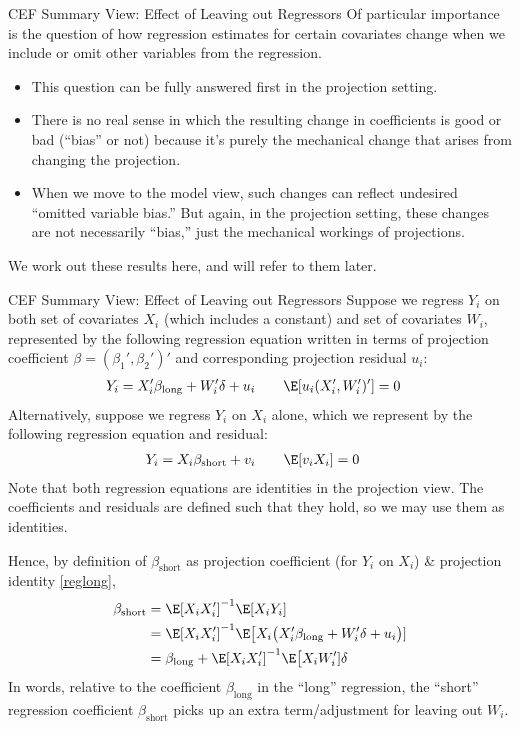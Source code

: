 \documentclass[aspectratio=169, handout]{beamer}
\begin{document}
{\footnotesize
\begin{frame}{CEF Summary View: Effect of Leaving out Regressors}
Of particular importance is the question of how regression estimates for
certain covariates change when we include or omit other variables from
the regression.
\begin{itemize}
  \item This question can be fully answered first in the projection
    setting.

  \item There is no real sense in which the resulting change in
    coefficients is good or bad (``bias'' or not) because it's purely
    the mechanical change that arises from changing the projection.

  \item When we move to the model view, such changes can reflect
    undesired ``omitted variable bias.'' But again, in the projection
    setting, these changes are not necessarily ``bias,'' just the
    mechanical workings of projections.
\end{itemize}
We work out these results here, and will refer to them later.
\end{frame}
}

{\scriptsize
\begin{frame}{CEF Summary View: Effect of Leaving out Regressors}
Suppose we regress $Y_i$ on both set of covariates $X_i$ (which includes
a constant) and set of covariates $W_i$, represented by the
following regression equation written in terms of projection coefficient
$\beta=(\beta_1',\beta_2')'$ and corresponding projection residual
$u_i$:
\begin{align}
  Y_i
  &=
  X_i'\beta_{\text{long}}
  +
  W_i'\delta
  +
  u_i
  \qquad
  \E[u_i (X_i',W_i')']
  = 0
  \label{reglong}
\end{align}
Alternatively, suppose we regress $Y_i$ on $X_i$ alone, which we
represent by the following regression equation and residual:
\begin{align*}
  Y_i
  &=
  X_i\beta_{\text{short}}
  +
  v_i
  \qquad
  \E[v_i X_i]=0
\end{align*}
Note that both regression equations are \alert{identities} in the
projection view.
The coefficients and residuals are defined such that they hold, so we
may use them as identities.

Hence, by definition of $\beta_{\text{short}}$ as projection
coefficient (for $Y_i$ on $X_i$) \& projection identity \ref{reglong},
\begin{align*}
  \beta_{\text{short}}
  &=
  \E[X_iX_i']^{-1}
  \E[X_iY_i]
  \\
  &=
  \E[X_iX_i']^{-1}
  \E\big[
  X_i
  \big(
  X_i'\beta_{\text{long}}
  +
  W_i'\delta
  +
  u_i
  \big)
  ]
  \\
  &=
  \beta_{\text{long}}
  +
  \E[X_iX_i']^{-1}
  \E\big[
  X_i
  W_i'
  ]
  \delta
\end{align*}
In words, relative to the coefficient $\beta_{\text{long}}$ in the
``\alert{long}'' regression,
the ``\alert{short}'' regression coefficient $\beta_{\text{short}}$
picks up an extra term/adjustment for leaving out $W_i$.
\end{frame}
}
\end{document}
